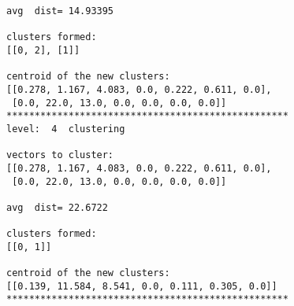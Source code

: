 \documentclass[11pt]{article}
\begin{document}
\begin{Verbatim}[commandchars=\\\{\}]
avg  dist= 14.93395

clusters formed:
[[0, 2], [1]]

centroid of the new clusters:
[[0.278, 1.167, 4.083, 0.0, 0.222, 0.611, 0.0],
 [0.0, 22.0, 13.0, 0.0, 0.0, 0.0, 0.0]]
**************************************************
level:  4  clustering

vectors to cluster:
[[0.278, 1.167, 4.083, 0.0, 0.222, 0.611, 0.0],
 [0.0, 22.0, 13.0, 0.0, 0.0, 0.0, 0.0]]

avg  dist= 22.6722

clusters formed:
[[0, 1]]

centroid of the new clusters:
[[0.139, 11.584, 8.541, 0.0, 0.111, 0.305, 0.0]]
**************************************************

    \end{Verbatim}


    
    
    
    
\end{document}
